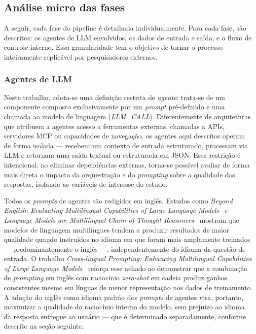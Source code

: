 \documentclass[a4paper,10pt,twocolumn]{article}
\begin{document}
\subsection{Análise micro das fases}

A seguir, cada fase do pipeline é detalhada individualmente. Para cada fase, são descritos: os agentes de LLM envolvidos, os dados de entrada e saída, e o fluxo de controle interno. Essa granularidade tem o objetivo de tornar o processo inteiramente replicável por pesquisadores externos.

\subsubsection{Agentes de LLM}

Neste trabalho, adota-se uma definição restrita de \textit{agente}: trata-se de um componente composto exclusivamente por um \textit{prompt} pré-definido e uma chamada ao modelo de linguagem (\textit{LLM\_CALL}). Diferentemente de arquiteturas que atribuem a agentes acesso a ferramentas externas, chamadas a APIs, servidores MCP ou capacidades de navegação, os agentes aqui descritos operam de forma isolada — recebem um contexto de entrada estruturado, processam via LLM e retornam uma saída textual ou estruturada em JSON. Essa restrição é intencional: ao eliminar dependências externas, torna-se possível avaliar de forma mais direta o impacto da orquestração e do \textit{prompting} sobre a qualidade das respostas, isolando as variáveis de interesse do estudo.

Todos os \textit{prompts} de agentes são redigidos em inglês. Estudos como \textit{Beyond English: Evaluating Multilingual Capabilities of Large Language Models}~\cite{huang2024beyond} e \textit{Language Models are Multilingual Chain-of-Thought Reasoners}~\cite{shi2023multilingualcot} mostram que modelos de linguagem multilíngues tendem a produzir resultados de maior qualidade quando instruídos no idioma em que foram mais amplamente treinados — predominantemente o inglês —, independentemente do idioma da questão de entrada. O trabalho \textit{Cross-lingual Prompting: Enhancing Multilingual Capabilities of Large Language Models}~\cite{qin2023crosslingual} reforça esse achado ao demonstrar que a combinação de \textit{prompting} em inglês com raciocínio \textit{zero-shot} em cadeia produz ganhos consistentes mesmo em línguas de menor representação nos dados de treinamento. A adoção do inglês como idioma padrão dos \textit{prompts} de agentes visa, portanto, maximizar a qualidade do raciocínio interno do modelo, sem prejuízo ao idioma da resposta entregue ao usuário — que é determinado separadamente, conforme descrito na seção seguinte.
\end{document}
